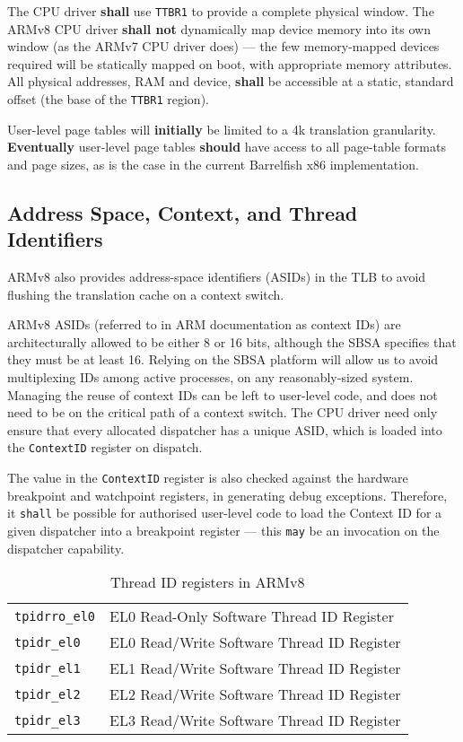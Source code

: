 \documentclass[a4paper,twoside]{report}
\begin{document}
The CPU driver \textbf{shall} use \texttt{TTBR1} to provide a complete
physical window. The ARMv8 CPU driver \textbf{shall not} dynamically map
device memory into its own window (as the ARMv7 CPU driver does) --- the few
memory-mapped devices required will be statically mapped on boot, with
appropriate memory attributes. All physical addresses, RAM and device,
\textbf{shall} be accessible at a static, standard offset (the base of the
\texttt{TTBR1} region).

User-level page tables will \textbf{initially} be limited to a 4k translation
granularity.  \textbf{Eventually} user-level page tables \textbf{should} have
access to all page-table formats and page sizes, as is the case in the current
Barrelfish x86 implementation.

\subsection{Address Space, Context, and Thread Identifiers}

ARMv8 also provides address-space identifiers (ASIDs) in the TLB to avoid
flushing the translation cache on a context switch.

ARMv8 ASIDs (referred to in ARM documentation as context IDs) are
architecturally allowed to be either 8 or 16 bits, although the SBSA
specifies that they must be at least 16. Relying on the SBSA platform will
allow us to avoid multiplexing IDs among active processes, on any
reasonably-sized system.  Managing the reuse of context IDs can be left to
user-level code, and does not need to be on the critical path of a context
switch. The CPU driver need only ensure that every allocated dispatcher has a
unique ASID, which is loaded into the \texttt{ContextID} register on dispatch.

The value in the \texttt{ContextID} register is also checked against the
hardware breakpoint and watchpoint registers, in generating debug exceptions.
Therefore, it \texttt{shall} be possible for authorised user-level code to
load the Context ID for a given dispatcher into a breakpoint register --- this
\texttt{may} be an invocation on the dispatcher capability.

\begin{table}
\begin{center}
\begin{tabular}{ll}
\texttt{tpidrro\_el0} & EL0 Read-Only Software Thread ID Register \\
\texttt{tpidr\_el0} & EL0 Read/Write Software Thread ID Register \\
\texttt{tpidr\_el1} & EL1 Read/Write Software Thread ID Register \\
\texttt{tpidr\_el2} & EL2 Read/Write Software Thread ID Register \\
\texttt{tpidr\_el3} & EL3 Read/Write Software Thread ID Register \\
\end{tabular}
\end{center}
\caption{Thread ID registers in ARMv8}
\label{t:threadid}
\end{table}
\end{document}
